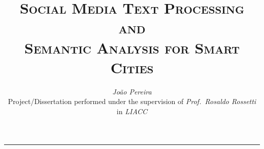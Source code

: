 \documentclass[9pt,a4paper]{extarticle}
\begin{document}
\title{\vspace*{-8mm}\textbf{\textsc{Social Media Text Processing and\\ Semantic Analysis for Smart Cities}}}
\author{\emph{João Pereira}\\[2mm]
\small{Project/Dissertation performed under the supervision of \emph{Prof.\ Rosaldo Rossetti}}\\
\small{in \emph{LIACC}}}
\date{}
\maketitle
\thispagestyle{empty}

\vspace*{-4mm}\noindent\rule{\textwidth}{0.4pt}\vspace*{4mm}
\end{document}

